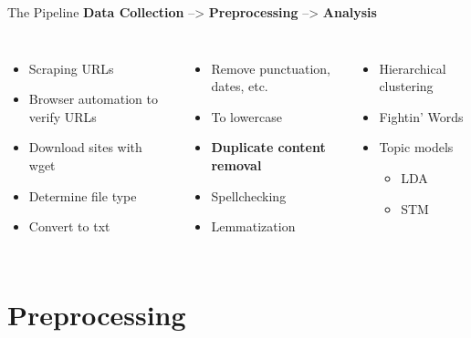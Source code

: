 \documentclass[12pt]{beamer}
\begin{document}
\begin{frame}{The Pipeline}
\textbf{Data Collection} \hspace{2mm} --> \hspace{2mm} \textbf{Preprocessing} \hspace{2mm} --> \hspace{2mm} \textbf{Analysis}
\begin{columns}
	\vspace{5mm}
	\begin{itemize}
		\item Scraping URLs
		\item Browser automation to verify URLs
		\item Download sites with wget
		\item Determine file type
		\item Convert to txt
	\end{itemize}		
	\vspace{5mm}
	\begin{itemize}
		\item Remove punctuation, dates, etc.
		\item To lowercase
		\item \textbf{Duplicate content removal}
		\item Spellchecking
		\item Lemmatization
	\end{itemize}
	\vspace{5mm}
	\begin{itemize}
		\item Hierarchical clustering
		\item Fightin' Words
		\item Topic models
		\begin{itemize}
			\item LDA
			\item STM
		\end{itemize}
	\end{itemize}
\end{columns}
\end{frame}

\section{Preprocessing}

\end{document}
